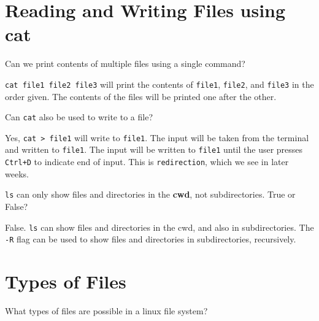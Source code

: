 \section{Reading and Writing Files using cat}

\begin{qs}
  Can we print contents of multiple files using a single command?
\end{qs}

\begin{ans}
  \texttt{cat file1 file2 file3} will print the contents of \texttt{file1}, \texttt{file2}, and \texttt{file3}
  in the order given. The contents of the files will be printed one after the other.
\end{ans}

\begin{qs}
  Can \texttt{cat} also be used to write to a file?
\end{qs}

\begin{ans}
  Yes, \texttt{cat > file1} will write to \texttt{file1}. The input will be taken from the
  terminal and written to \texttt{file1}. The input will be written to \texttt{file1} until
  the user presses \texttt{Ctrl+D} to indicate end of input.
  This is \texttt{redirection}, which we see in later weeks.
\end{ans}

\begin{qs}
  \texttt{ls} can only show files and directories in the \textbf{cwd}, not subdirectories.
  True or False?
\end{qs}

\begin{ans}
  False. \texttt{ls} can show files and directories in the cwd, and also in subdirectories.
  The \texttt{-R} flag can be used to show files and directories in subdirectories, recursively.
\end{ans}

\section{Types of Files}

\begin{qs}
  What types of files are possible in a linux file system?
\end{qs}


